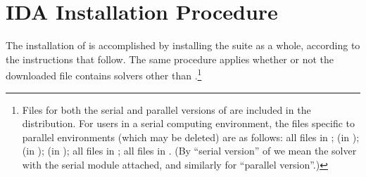 \chapter{IDA Installation Procedure}\label{c:install}

The installation of {\ida} is accomplished by installing the
{\sundials} suite as a whole, according to the instructions that
follow.   The same procedure applies whether or not the downloaded
file contains solvers other than {\ida}.\footnote{Files for both the
serial and parallel versions of {\ida} are included in the distribution.
For users in a serial computing environment, the files specific to parallel
environments (which may be deleted) are as follows:
all files in ;
 (in );
 (in ); 
 (in );
all files in ;
all files in .
(By ``serial version'' of {\ida} we mean the {\ida} solver with the
serial {\nvector} module attached, and similarly for ``parallel version''.)}

